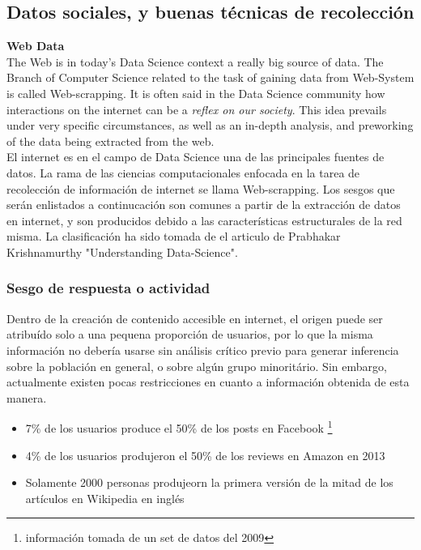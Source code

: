 \subsection{Datos sociales, y buenas técnicas de recolección}

\textbf{Web Data}\\
The Web is in today's Data Science context a really big source of data. The Branch of Computer Science related to the task of gaining data from Web-System is called Web-scrapping. It is often said in the Data Science community how interactions on the internet can be a \textsl{reflex on our society}. This idea prevails under very specific circumstances, as well as an in-depth analysis, and preworking of the data being extracted from the web.\\

El internet es en el campo de Data Science una de las principales fuentes de datos. La rama de las ciencias computacionales enfocada en la tarea de recolección de información de internet se llama Web-scrapping.
Los sesgos que serán enlistados a continucación son comunes a partir de la extracción de datos en internet, y son producidos debido a las características estructurales de la red misma. La clasificación ha sido tomada de el articulo de Prabhakar Krishnamurthy "Understanding Data-Science".\cite{Kris19}\\

\subsubsection{Sesgo de respuesta o actividad}

Dentro de la creación de contenido accesible en internet, el origen puede ser atribuído solo a una pequena proporción de usuarios, por lo que la misma información no debería usarse sin análisis crítico previo para generar inferencia sobre la población en general, o sobre algún grupo minoritário. Sin embargo, actualmente existen pocas restricciones en cuanto a información obtenida de esta manera.

\begin{itemize}
  \item 7\% de los usuarios produce el 50\% de los posts en Facebook \footnote{información tomada de un set de datos del 2009}
  \item 4\% de los usuarios produjeron el 50\% de los reviews en Amazon en 2013
  \item Solamente 2000 personas produjeorn la primera versión de la mitad de los artículos en Wikipedia en inglés \cite{Baez18}
\end{itemize}




